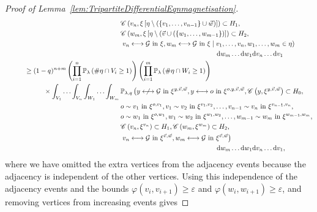 \documentclass[10pt,a4paper,dvipsnames]{article}
\theoremstyle{definition}
\theoremstyle{remark}
\newcommand{\pla}{\mathbb P_\lambda}
\newcommand{\plaq}{\mathbb{P}_{\lambda,q}}
\newcommand{\dd}{\mathrm{d}} %
\newcommand{\C}{\mathscr {C}}
\newcommand{\Gcal}{\mathcal{G}}
\newcommand{\conn}[3]{#1 \longleftrightarrow #2\textrm { in } #3}
\newcommand{\adja}[3]{#1 \sim #2\textrm { in } #3}
\newcommand{\nconn}[3]{#1 \centernot\longleftrightarrow #2\textrm { in } #3}
\newcommand{\orig}{o}
\newcommand{\connf}{\varphi}
\numberwithin{equation}{section}
\begin{document}
\begin{proof}[Proof of Lemma~\ref{lem:TripartiteDifferentialEqnmagnetisation}]
\begin{align}
        &\hspace{6cm} \C\left(v_n,\xi\left[\eta\setminus\left(\left\{v_1,\ldots,v_{n-1}\right\}\cup\vec{w}\right)\right]\right)\subset H_1,\nonumber\\
        &\hspace{6cm} \C\left(w_m,\xi\left[\eta\setminus\left(\vec{v}\cup(\left\{w_1,\ldots,w_{m-1}\right\}\right)\right]\right)\subset H_2,\nonumber\\
        &\hspace{6cm} \left.\conn{v_n}{\Gcal}{\xi}, \conn{w_m}{\Gcal}{\xi} \;\middle|\; v_1,\ldots,v_n,w_1,\ldots,w_m\in\eta\right)\nonumber\\
        &\hspace{11cm}\dd w_m \ldots \dd w_1\dd v_n \ldots \dd v_1\nonumber\\
        &\hspace{1cm} \geq (1-q)^{n+m}\left(\prod^n_{i=1}\pla\left(\#\eta\cap V_i\geq 1\right)\right)\left(\prod^m_{i=1}\pla\left(\#\eta\cap W_i\geq 1\right)\right)\nonumber\\
        &\hspace{2cm} \times \int_{V_1}\ldots\int_{V_n}\int_{W_1}\ldots\int_{W_m}  \plaq\left(\nconn{y}{\Gcal}{\xi^{y,\vec{v},\vec{w}}},\conn{y}{\orig}{\xi^{\orig,y,\vec{v},\vec{w}}},
        \C\left(y,\xi^{y,\vec{v},\vec{w}}\right)\subset H_0,\right.\nonumber\\
        &\hspace{6cm} \adja{\orig}{v_1}{\xi^{\orig,v_1}},\adja{v_{1}}{v_2}{\xi^{v_1,v_2}},\ldots,\adja{v_{n-1}}{v_n}{\xi^{v_{n-1},v_n}},\nonumber\\
        &\hspace{6cm}\adja{\orig}{w_1}{\xi^{\orig,w_1}},\adja{w_{1}}{w_2}{\xi^{w_1,w_2}},\ldots,\adja{w_{m-1}}{w_m}{\xi^{w_{m-1},w_m}},\nonumber\\
        &\hspace{6cm} \C\left(v_n,\xi^{v_n}\right)\subset H_1, \C\left(w_m,\xi^{w_m}\right)\subset H_2,\nonumber\\
        &\hspace{6cm} \left.\conn{v_n}{\Gcal}{\xi^{\vec{v},\vec{w}}}, \conn{w_m}{\Gcal}{\xi^{\vec{v},\vec{w}}}\right)\nonumber\\
        &\hspace{11cm}\dd w_m \ldots \dd w_1\dd v_n \ldots \dd v_1,
    \end{align}
    where we have omitted the extra vertices from the adjacency events because the adjacency is independent of the other vertices. Using this independence of the adjacency events and the bounds $\connf\left(v_i,v_{i+1}\right)\geq \varepsilon$ and $\connf\left(w_i,w_{i+1}\right)\geq \varepsilon$, and removing vertices from increasing events gives

\end{proof}
\end{document}
